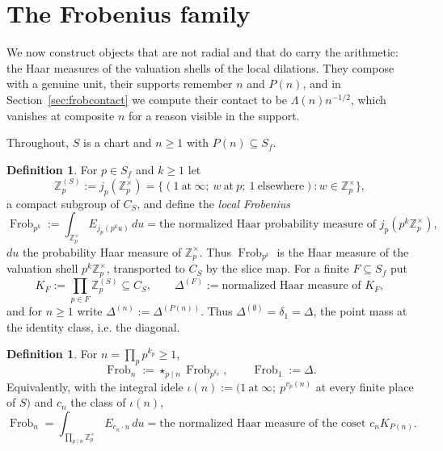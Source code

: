\documentclass[11pt]{amsart}
\theoremstyle{definition}
\newtheorem{definition}[theorem]{Definition}
\theoremstyle{remark}
\newcommand{\Z}{\mathbb Z}
\newcommand{\Frob}{\operatorname{Frob}}
\begin{document}
\section{The Frobenius family}\label{sec:frob}

We now construct objects that are not radial and that do carry the
arithmetic: the Haar measures of the valuation shells of the local dilations.
They compose with a genuine unit, their supports remember $n$ and $P(n)$, and
in Section~\ref{sec:frobcontact} we compute their contact to be
$\Lambda(n)n^{-1/2}$, which vanishes at composite $n$ for a reason visible in
the support.

Throughout, $S$ is a chart and $n\ge1$ with $P(n)\subseteq S_f$.

\begin{definition}\label{def:localfrob}
For $p\in S_f$ and $k\ge1$ let
\[
  \Z_p^{(S)}:=j_p(\Z_p^\times)
   =\{(1\ \text{at}\ \infty;\ w\ \text{at}\ p;\ 1\ \text{elsewhere}):
      w\in\Z_p^\times\},
\]
a compact subgroup of $C_S$, and define the \emph{local Frobenius}
\begin{equation}\label{eq:localfrob}
  \Frob_{p^k}:=\int_{\Z_p^\times}E_{j_p(p^ku)}\,du
   =\text{the normalized Haar probability measure of }
     j_p(p^k\Z_p^\times),
\end{equation}
$du$ the probability Haar measure of $\Z_p^\times$. Thus $\Frob_{p^k}$ is the
Haar measure of the valuation shell $p^k\Z_p^\times$, transported to $C_S$ by
the slice map. For a finite $F\subseteq S_f$ put
\[
  K_F:=\prod_{p\in F}\Z_p^{(S)}\subseteq C_S,\qquad
  \Delta^{(F)}:=\text{normalized Haar measure of }K_F,
\]
and for $n\ge1$ write $\Delta^{(n)}:=\Delta^{(P(n))}$. Thus
$\Delta^{(\emptyset)}=\delta_1=\Delta$, the point mass at the identity class,
i.e. the diagonal.
\end{definition}

\begin{definition}\label{def:frob}
For $n=\prod_p p^{k_p}\ge1$,
\begin{equation}\label{eq:frob}
  \Frob_n:=\mathop{\star}_{p\mid n}\Frob_{p^{k_p}},\qquad \Frob_1:=\Delta .
\end{equation}
Equivalently, with the integral idele
$\iota(n):=(1\ \text{at}\ \infty;\ p^{v_p(n)}$ at every finite place of $S)$
and $c_n$ the class of $\iota(n)$,
\begin{equation}\label{eq:frobcoset}
  \Frob_n=\int_{\prod_{p\mid n}\Z_p^\times}E_{c_n\cdot u}\,du
   =\text{the normalized Haar measure of the coset } c_nK_{P(n)} .
\end{equation}
\end{definition}
\end{document}
